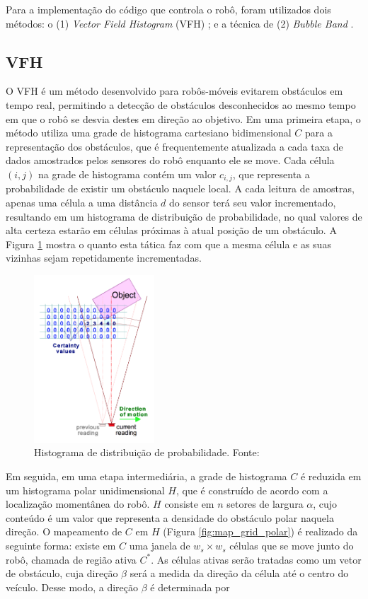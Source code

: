 Para a implementação do código que controla o robô, foram
utilizados dois métodos: o (1) \textit{Vector Field Histogram} (VFH)
\cite{c1}; e a técnica de (2) \textit{Bubble Band} \cite{c3}.
\\

\subsection{VFH}
\label{sec:vfh}

O VFH é um método desenvolvido para robôs-móveis evitarem obstáculos em tempo real, permitindo a
detecção de obstáculos desconhecidos ao mesmo tempo em que o robô se desvia destes em direção
ao objetivo. Em uma primeira etapa, o método utiliza uma grade de histograma cartesiano bidimensional $C$ para a representação dos obstáculos, que é frequentemente atualizada a cada taxa de dados amostrados pelos sensores do robô enquanto ele se move. Cada célula $(i,j)$ na grade de histograma contém um valor $c_{i,j}$, que representa a probabilidade de existir um obstáculo naquele local. A cada leitura de amostras, apenas uma célula a uma distância $d$ do sensor terá seu valor incrementado, resultando em um histograma de distribuição de probabilidade, no qual valores de alta certeza estarão em células próximas à atual posição de um obstáculo. A Figura \ref{fig:histog_dist_prob} mostra o quanto esta tática faz com que a mesma célula e as suas vizinhas sejam repetidamente incrementadas.

\begin{figure}[H]
    \centering
    \includegraphics[width=0.4\textwidth]{img/histog_dist_prob}
    \caption{Histograma de distribuição de probabilidade. Fonte: \cite{c1}}
    \label{fig:histog_dist_prob}
\end{figure}

Em seguida, em uma etapa intermediária, a grade de histograma $C$ é reduzida em um histograma polar unidimensional $H$, que é construído de acordo com a localização momentânea do robô. $H$ consiste em $n$ setores de largura $\alpha$, cujo conteúdo é um valor que representa a densidade do obstáculo polar naquela direção. O mapeamento de $C$ em $H$ (Figura \ref{fig:map_grid_polar}) é realizado da seguinte forma: existe em $C$ uma janela de $w_{s} \times w_{s}$ células que se move junto do robô, chamada de região ativa $C^{*}$. As células ativas serão tratadas como um vetor de obstáculo, cuja direção $\beta$ será a medida da direção da célula até o centro do veículo. Desse modo, a direção $\beta$ é determinada por

